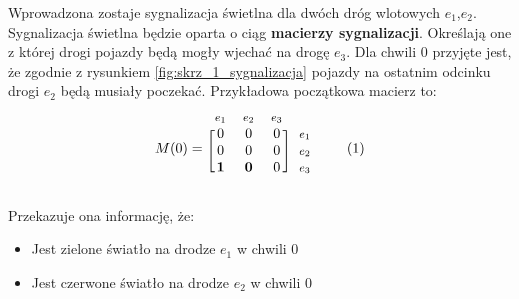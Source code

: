 \documentclass[12pt]{book}
\newcommand\addtag{\refstepcounter{equation}
\tag{\theequation}}
\begin{document}
Wprowadzona zostaje sygnalizacja świetlna dla dwóch dróg wlotowych $e_1$,$e_2$. Sygnalizacja świetlna będzie oparta o ciąg \textbf{macierzy sygnalizacji}. Określają one z której drogi pojazdy będą mogły wjechać na drogę $e_3$. Dla chwili 0 przyjęte jest, że zgodnie z rysunkiem \ref{fig:skrz_1_sygnalizacja} pojazdy na ostatnim odcinku drogi $e_2$ będą musiały poczekać. 
Przykładowa początkowa macierz to:
\begin{equation*}
  M(0)=
  \begin{blockarray}{*{3}{c} l}
    \begin{block}{*{3}{>{$\footnotesize}c<{$}} l}
     $e_1$ & $e_2$ & $e_3$\\
    \end{block}
    \begin{block}{[*{3}{c}]>{$\footnotesize}l<{$}}
       0 & 0 & 0 & $e_1$ \\
       0 & 0 & 0 & $e_2$ \\
       \textbf{1} & \textbf{0} & 0 & $e_3$ \\
    \end{block}
  \end{blockarray} \addtag
\end{equation*}

Przekazuje ona informację, że:
\begin{itemize}
\item Jest zielone światło na drodze $e_1$ w chwili 0 
\item Jest czerwone światło na drodze $e_2$ w chwili 0
\end{itemize}
\end{document}
